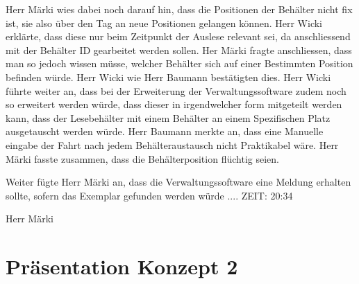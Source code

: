\documentclass[parskip=full, a4paper]{scrreprt}
\begin{document}
Herr Märki wies dabei noch darauf hin, dass die Positionen der Behälter nicht fix ist, sie also über den Tag an neue Positionen gelangen können. Herr Wicki erklärte, dass diese nur beim Zeitpunkt der Auslese relevant sei, da anschliessend mit der Behälter ID gearbeitet werden sollen.
Her Märki fragte anschliessen, dass man so jedoch wissen müsse, welcher Behälter sich auf einer Bestimmten Position befinden würde. Herr Wicki wie Herr Baumann bestätigten dies.
Herr Wicki führte weiter an, dass bei der Erweiterung der Verwaltungssoftware zudem noch so erweitert werden würde, dass dieser in irgendwelcher form mitgeteilt werden kann, dass der Lesebehälter mit einem Behälter an einem Spezifischen Platz ausgetauscht werden würde. Herr Baumann merkte an, dass eine Manuelle eingabe der Fahrt nach jedem Behälteraustausch nicht Praktikabel wäre. Herr Märki fasste zusammen, dass die Behälterposition flüchtig seien.

Weiter fügte Herr Märki an, dass die Verwaltungssoftware eine Meldung erhalten sollte, sofern das Exemplar gefunden werden würde .... ZEIT:  20:34



Herr Märki 




















\chapter{Präsentation Konzept 2}
\end{document}
